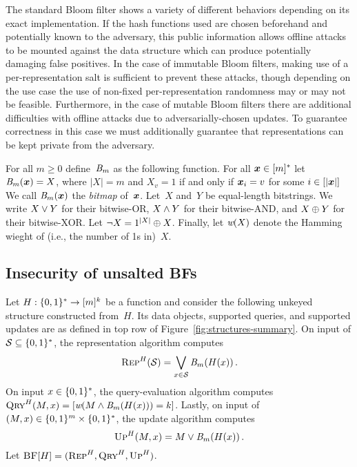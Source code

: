 
%
%
The standard Bloom filter shows a variety of different behaviors depending on
its exact implementation. If the hash functions used are chosen beforehand and
potentially known to the adversary, this public information allows offline
attacks to be mounted against the data structure which can produce potentially
damaging false positives. In the case of immutable Bloom filters, making use of
a per-representation salt is sufficient to prevent these attacks, though
depending on the use case the use of non-fixed per-representation randomness may
or may not be feasible. Furthermore, in the case of mutable Bloom filters there
are additional difficulties with offline attacks due to adversarially-chosen
updates. To guarantee correctness in this case we must additionally guarantee
that representations can be kept private from the adversary.

%
%
For all $m\geq0$ define~$\textit{B}_m$ as the following function.
For all $\v.x\in[m]^*$ let $\bmap_m(\v.x) = X$, where
$|X|=m$ and $X_v=1$ if and only if $\v.x_i = v$ for some $i\in[|\v.x|]$
%
We call $\bmap_m(\v.x)$ the \emph{bitmap} of~$\v.x$.
%
Let~$X$ and~$Y$ be equal-length bitstrings. We write $X \vee Y$ for their
bitwise-OR, $X \wedge Y$ for their bitwise-AND, and $X \mathbin{\oplus} Y$ for their
bitwise-XOR. Let $\neg X = 1^{|X|} \mathbin{\oplus} X$.
%
Finally, let $\textit{w}(X)$ denote the Hamming wieght of (i.e., the number of 1s in)~$X$.

\subsection{Insecurity of unsalted BFs}
Let $H:\{0,1\}^*\to[m]^k$ be a function and consider the following unkeyed
structure constructed from~$H$. Its data objects, supported queries, and
supported updates are as defined in top row of
Figure~\ref{fig:structures-summary}.
%
On input of $\mathcal{S}\subseteq\{0,1\}^*$, the representation algorithm computes
%
\[
  \textsc{Rep}^H(\mathcal{S}) = \bigvee_{x\in\mathcal{S}} \textit{B}_m(H(x)) \,.
\]
%
On input $x\in\{0,1\}^*$, the query-evaluation algorithm computes $\textsc{Qry}^H(M,x) =
[\textit{w}(M \wedge \textit{B}_m(H(x))) = k]$.
%
Lastly, on input of $(M, x) \in \{0,1\}^m\times\{0,1\}^*$, the update algorithm computes
%
\[
  \textsc{Up}^H(M,x)= M \vee \textit{B}_m(H(x)) \,.
\]
%
Let $\textsc{BF}[H] = (\textsc{Rep}^H, \textsc{Qry}^H, \textsc{Up}^H)$.
%


